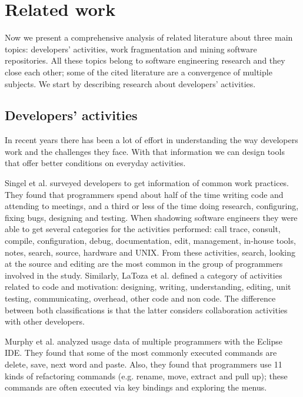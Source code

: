 \chapter{Related work}
Now we present a comprehensive analysis of related literature about three main topics: developers' activities, work fragmentation and mining software repositories. All these topics belong to software engineering research and they close each other; some of the cited literature are a convergence of multiple subjects. We start by describing research about developers' activities.

\section{Developers' activities}
In recent years there has been a lot of effort in understanding the way developers work and the challenges they face. With that information we can design tools \cite{CD10, P14, CLQ15, KM06} that offer better conditions on everyday activities. 

Singel et al. \cite{SLV10} surveyed developers to get information of common work practices. They found that programmers spend about half of the time writing code and attending to meetings, and a third or less of the time doing research, configuring, fixing bugs, designing and testing. When shadowing software engineers they were able to get several categories for the activities performed: call trace, consult, compile, configuration, debug, documentation, edit, management, in-house tools, notes, search, source, hardware and UNIX. From these activities, search, looking at the source and editing are the most common in the group of programmers involved in the study. Similarly, LaToza et al. \cite{LVD06} defined a category of activities related to code and motivation: designing, writing, understanding, editing, unit testing, communicating, overhead, other code and non code. The difference between both classifications is that the latter considers collaboration activities with other developers.

Murphy et al. \cite{MKF06} analyzed usage data of multiple programmers with the Eclipse IDE. They found that some of the most commonly executed commands are delete, save, next word and paste. Also, they found that programmers use 11 kinds of refactoring commands (e.g. rename, move, extract and pull up); these commands are often executed via key bindings and exploring the menus.

